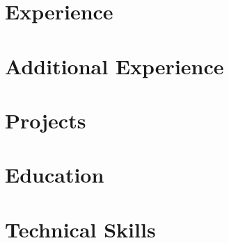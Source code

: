 


\pagestyle{empty}
\resumeHeader

\section{Experience}


\section{Additional Experience}


\section{Projects}


\section{Education}




\section{Technical Skills}



